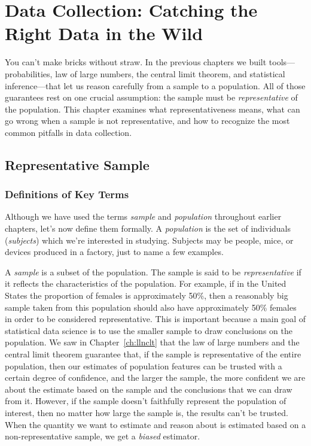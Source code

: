 \chapter{Data Collection: Catching the Right Data in the Wild}\label{ch:data}
You can't make bricks without straw. In the previous chapters we built
tools---probabilities, law of large numbers, the central limit
theorem, and statistical inference---that let
us reason carefully from a sample to a population. All of those guarantees rest on
one crucial assumption: the sample must be \emph{representative} of the population.
This chapter examines what representativeness means, what can go wrong when a sample
is not representative, and how to recognize the most common pitfalls in data
collection.

\section{Representative Sample}\label{representative}
\subsection{Definitions of Key Terms}\label{keyterms}
Although we have used the terms \emph{sample} and \emph{population} throughout
earlier chapters, let's now define them formally. A
\emph{population} is the set of individuals
(\emph{subjects}) which we're interested in
studying. Subjects may be people, mice, or devices produced in a factory, just
to name a few examples.

A \emph{sample} is a subset of the population. The sample is said to be
\emph{representative} if it reflects the characteristics of the population.
For example, if in the United States the proportion of females is approximately 50\%,
then a reasonably big sample taken from this population should also
have approximately 50\% females
in order to be considered representative.
This is important because a main goal of statistical data science is to use the
smaller sample to draw conclusions on the population.
We saw in Chapter~\ref{ch:llnclt} that the law of large numbers and the central limit
theorem guarantee that, if the sample is representative of the entire population,
then our estimates of population features can be trusted with a certain degree of confidence,
and the larger the sample, the more confident we are about the
estimate based on the sample
and the conclusions that we can draw from it.
However, if the sample doesn't faithfully represent the population of interest, then no matter
how large the sample is, the results can't be trusted. When the quantity we want
to estimate and reason about is estimated based on a non-representative sample,
we get a \emph{biased} estimator.

